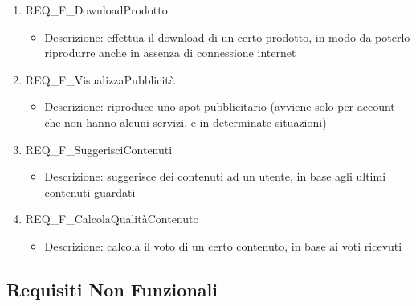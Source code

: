 \begin{enumerate}
	\item REQ\_F\_DownloadProdotto
		\begin{itemize}	
			\item Descrizione: effettua il download di un certo prodotto, in modo da poterlo riprodurre anche in assenza di connessione internet
		\end{itemize}
	
	\item REQ\_F\_VisualizzaPubblicità
		\begin{itemize}
			\item Descrizione: riproduce uno spot pubblicitario (avviene solo per account che non hanno alcuni servizi, e in determinate situazioni)
		\end{itemize}
	
	\item REQ\_F\_SuggerisciContenuti
		\begin{itemize}	
			\item Descrizione: suggerisce dei contenuti ad un utente, in base agli ultimi contenuti guardati
		\end{itemize}
		
	\item REQ\_F\_CalcolaQualitàContenuto
		\begin{itemize}	
			\item Descrizione: calcola il voto di un certo contenuto, in base ai voti ricevuti
		\end{itemize}
	


\end{enumerate}

\subsection{Requisiti Non Funzionali}

